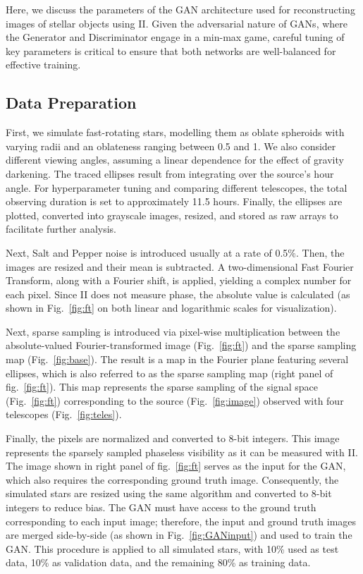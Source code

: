 Here, we discuss the parameters of the GAN architecture used for reconstructing images of stellar objects using II. Given the adversarial nature of GANs, where the Generator and Discriminator engage in a min-max game, careful tuning of key parameters is critical to ensure that both networks are well-balanced for effective training.

\subsection{Data Preparation}
First, we simulate fast-rotating stars, modelling them as oblate spheroids with varying radii and an oblateness ranging between 0.5 and 1. We also consider different viewing angles, assuming a linear dependence for the effect of gravity darkening. The traced ellipses result from integrating over the source's hour angle. For hyperparameter tuning and comparing different telescopes, the total observing duration is set to approximately 11.5 hours. Finally, the ellipses are plotted, converted into grayscale images, resized, and stored as raw arrays to facilitate further analysis.

Next, Salt and Pepper noise is introduced usually at a rate of 0.5\%. Then, the images are resized and their mean is subtracted. A two-dimensional Fast Fourier Transform, along with a Fourier shift, is applied, yielding a complex number for each pixel. Since II does not measure phase, the absolute value is calculated (as shown in Fig.~\ref{fig:ft} on both linear and logarithmic scales for visualization). 

Next, sparse sampling is introduced via pixel-wise multiplication between the absolute-valued Fourier-transformed image (Fig.~\ref{fig:ft}) and the sparse sampling map (Fig.~\ref{fig:base}). The result is a map in the Fourier plane featuring several ellipses, which is also referred to as the sparse sampling map (right panel of fig.~\ref{fig:ft}). This map represents the sparse sampling of the signal space (Fig.~\ref{fig:ft}) corresponding to the source (Fig.~\ref{fig:image}) observed with four telescopes (Fig.~\ref{fig:teles}). 

Finally, the pixels are normalized and converted to 8-bit integers. This image represents the sparsely sampled phaseless visibility as it can be measured with II. The image shown in right panel of fig.~\ref{fig:ft} serves as the input for the GAN, which also requires the corresponding ground truth image. Consequently, the simulated stars are resized using the same algorithm and converted to 8-bit integers to reduce bias. The GAN must have access to the ground truth corresponding to each input image; therefore, the input and ground truth images are merged side-by-side (as shown in Fig.~\ref{fig:GANinput}) and used to train the GAN. This procedure is applied to all simulated stars, with 10\% used as test data, 10\% as validation data, and the remaining 80\% as training data.


